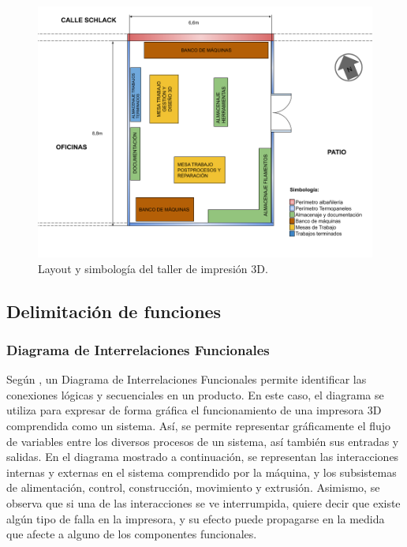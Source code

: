 \begin{figure}[H]
\centering
\includegraphics[scale=0.4]{images/layout.png}
\caption{Layout y simbología del taller de impresión 3D.}
\end{figure}

\subsection{Delimitación de funciones}

\subsubsection{Diagrama de Interrelaciones Funcionales}

Según \cite{unit2009}, un Diagrama de Interrelaciones Funcionales permite identificar las conexiones lógicas y secuenciales en un producto. En este caso, el diagrama se utiliza para expresar de forma gráfica el funcionamiento de una impresora 3D comprendida como un sistema. Así, se permite representar gráficamente el flujo de variables entre los diversos procesos de un sistema, así también sus entradas y salidas. En el diagrama mostrado a continuación, se representan las interacciones internas y externas en el sistema comprendido por la máquina, y los subsistemas de alimentación, control, construcción, movimiento y extrusión. Asimismo, se observa que si una de las interacciones se ve interrumpida, quiere decir que existe algún tipo de falla en la impresora, y su efecto puede propagarse en la medida que afecte a alguno de los componentes funcionales.

